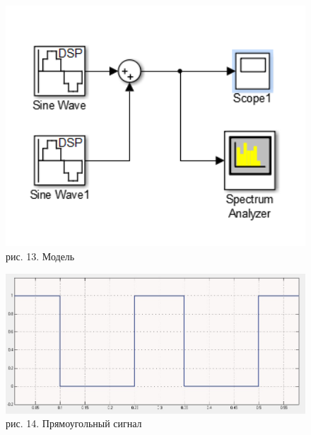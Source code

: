 \documentclass[10pt,a4paper]{report}
\begin{document}
\begin{figure}
\begin{center}
\includegraphics[width=150mm, scale = 0.9]{5_9.jpg}\newline
рис. 13. Модель\newline
\end{center}
\end{figure}
\begin{figure}
\begin{center}
\includegraphics[width=150mm, scale = 0.9]{5_10.jpg}\newline
рис. 14. Прямоугольный сигнал\newline
\end{center}
\end{figure}
\end{document}
